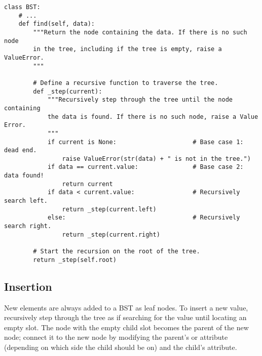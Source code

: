 \begin{lstlisting}
class BST:
    # ...
    def find(self, data):
        """Return the node containing the data. If there is no such node
        in the tree, including if the tree is empty, raise a ValueError.
        """

        # Define a recursive function to traverse the tree.
        def _step(current):
            """Recursively step through the tree until the node containing
            the data is found. If there is no such node, raise a Value Error.
            """
            if current is None:                     # Base case 1: dead end.
                raise ValueError(str(data) + " is not in the tree.")
            if data == current.value:               # Base case 2: data found!
                return current
            if data < current.value:                # Recursively search left.
                return _step(current.left)
            else:                                   # Recursively search right.
                return _step(current.right)

        # Start the recursion on the root of the tree.
        return _step(self.root)
\end{lstlisting}

\subsection*{Insertion} %

New elements are always added to a BST as leaf nodes.
To insert a new value, recursively step through the tree as if searching for the value until locating an empty slot.
The node with the empty child slot becomes the parent of the new node; connect it to the new node by modifying the parent's  or  attribute (depending on which side the child should be on) and the child's  attribute.

